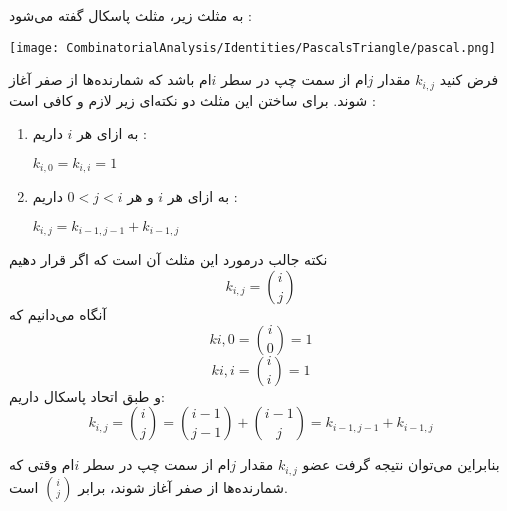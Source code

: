 
به مثلث زیر، مثلث پاسکال گفته می‌شود :

\begin{center}
  \texttt{[image: CombinatorialAnalysis/Identities/PascalsTriangle/pascal.png]}
\end{center}

فرض کنید
$k_{i,j}$
مقدار 
$j$ام
از سمت چپ در سطر
$i$ام
باشد که شمارنده‌ها از صفر آغاز شوند. برای ساختن این مثلث دو نکته‌ای زیر لازم و کافی است :
\begin{enumerate}
  \item 
  به ازای هر
  $i$
  داریم :
  \begin{center}
    $k_{i,0} = k_{i,i} = 1$
  \end{center}

  \item 
  به ازای هر 
  $i$ و هر
  $0 < j < i$
  داریم :
  \begin{center}
    $k_{i,j} = k_{i-1,j-1} + k_{i-1,j}$
  \end{center}
\end{enumerate}

نکته جالب درمورد این مثلث آن است که اگر قرار دهیم
$$k_{i,j} = {i \choose j}$$
آنگاه می‌دانیم که
$$k{i,0} = {i \choose 0} = 1$$
$$k{i,i} = {i \choose i} = 1$$
و طبق اتحاد پاسکال داریم:
$$k_{i,j} = {i \choose j} = {i-1 \choose j-1} + {i-1 \choose j} = k_{i-1,j-1} + k_{i-1,j}$$

بنابراین می‌توان نتیجه گرفت عضو
$k_{i,j}$
مقدار 
$j$ام
از سمت چپ در سطر
$i$ام
وقتی که شمارنده‌ها از صفر آغاز شوند، برابر 
$i \choose j$
است.